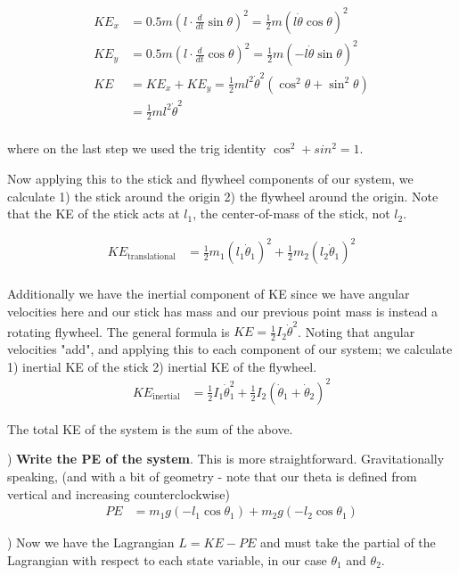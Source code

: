 \documentclass[conference]{IEEEtran}
\begin{document}
\begin{align}
    KE_x &= 0.5 m (l \cdot \frac{d}{dt} \sin \theta)^2 = \frac{1}{2} m (l \dot\theta \cos \theta)^2 \\
    KE_y &= 0.5 m (l \cdot \frac{d}{dt} \cos \theta)^2  = \frac{1}{2} m (- l \dot\theta \sin\theta)^2 \\
    KE &= KE_x + KE_y = \frac{1}{2} m l^2 \dot \theta^2 (\cos^2 \theta + \sin^2 \theta) \\
       &= \frac{1}{2} m l^2 \dot\theta^2 \\
\end{align}

where on the last step we used the trig identity $\cos^2 + sin^2 = 1$.

Now applying this to the stick and flywheel components of our system, we
calculate 1) the stick around the origin 2) the flywheel around the origin. Note
that the KE of the stick acts at $l_1$, the center-of-mass of the stick, not
$l_2$.

\begin{align}
    KE_{\text{translational}} &= \frac{1}{2} m_1 (l_1 \dot\theta_1)^2 + \frac{1}{2} m_2 (l_2 \dot\theta_1)^2\\
\end{align}

Additionally we have the inertial component of KE since we have angular
velocities here and our stick has mass and our previous point mass is instead a rotating
flywheel. The general formula is $KE = \frac{1}{2} I_2 \dot\theta^2$.
Noting that angular velocities "add", and applying this to each component of our
system; we calculate 1) inertial KE of the stick 2) inertial KE of the flywheel.
\begin{align}
    KE_{\text{inertial}} &= \frac{1}{2} I_1 \dot\theta_1^2 + \frac{1}{2}
    I_2 (\dot\theta_1 + \dot\theta_2)^2
\end{align}

The total KE of the system is the sum of the above.

) \textbf{Write the PE of the system}. This is more straightforward. Gravitationally
speaking, (and with a bit of geometry - note that our theta is defined from
vertical and increasing counterclockwise)
\begin{align}
    PE &= m_1 g (- l_1 \cos\theta_1) + m_2 g (- l_2 \cos\theta_1)
\end{align}

) Now we have the Lagrangian $L = KE - PE$ and must take the partial of the Lagrangian with
respect to each state variable, in our case $\theta_1$ and $\theta_2$.
\end{document}
